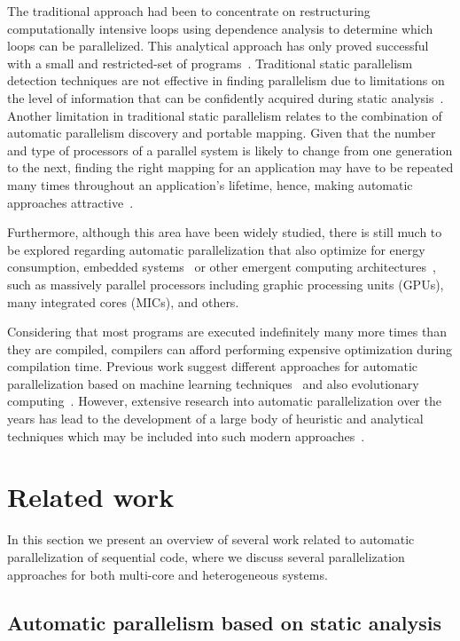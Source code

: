 \documentclass[a4paper,12pt]{article}
\begin{document}
The traditional approach had been to concentrate on restructuring
computationally intensive loops using dependence analysis to determine which
loops can be parallelized.  This analytical approach has only proved successful
with a small and restricted-set of programs~\cite{williams99}. Traditional
static parallelism detection techniques are not effective in finding
parallelism due to limitations on the level of information that can be
confidently acquired during static analysis~\cite{tournavitis09,wang14a}.
Another limitation in traditional static parallelism relates to the combination
of automatic parallelism discovery and portable mapping.  Given that the number
and type of processors of a parallel system is likely to change from one
generation to the next, finding the right mapping for an application may have
to be repeated many times throughout an application’s lifetime, hence, making
automatic approaches attractive~\cite{tournavitis09,wang14a}.

Furthermore, although this area have been widely studied, there is still much
to be explored regarding automatic parallelization that also optimize for
energy consumption, embedded systems~\cite{cordes10} or other emergent
computing architectures~\cite{baskaran10}, such as massively parallel
processors including graphic processing units (GPUs), many integrated cores
(MICs), and others.

Considering that most programs are executed indefinitely many more times than
they are compiled, compilers can afford performing expensive optimization
during compilation time.  Previous work suggest different approaches for
automatic parallelization based on machine learning
techniques~\cite{tournavitis09,wang14a} and also evolutionary
computing~\cite{walsh95,walsh96,williams96,williams99}.  However, extensive
research into automatic parallelization over the years has lead to the
development of a large body of heuristic and analytical techniques which may be
included into such modern approaches~\cite{williams99}. 

\section{Related work}

In this section we present an overview of several work related to automatic
parallelization of sequential code, where we discuss several parallelization
approaches for both multi-core and heterogeneous systems.

\subsection{Automatic parallelism based on static analysis}
\end{document}
